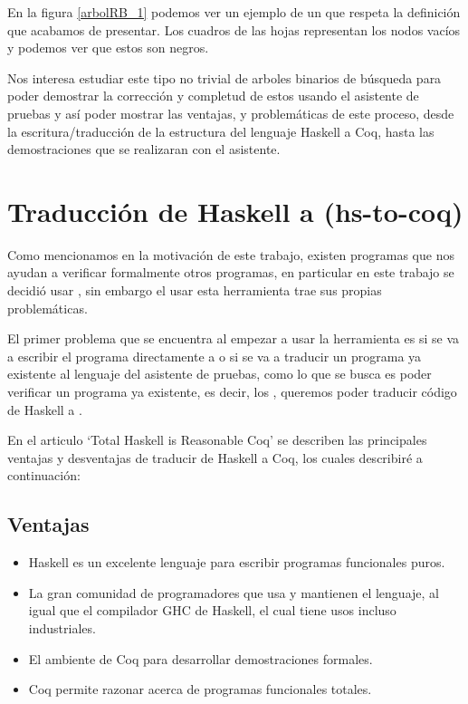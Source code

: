 En la figura \ref{arbolRB_1} podemos ver un ejemplo de un \arn que respeta la definici\'on que
acabamos de presentar. Los cuadros de las hojas representan los nodos vacíos y podemos ver que
estos son negros.

Nos interesa estudiar este tipo no trivial de arboles binarios de búsqueda para poder demostrar la
correcci\'on y completud de estos usando el asistente de pruebas {\coq} y así poder mostrar las
ventajas, y problemáticas de este proceso, desde la escritura/traducción de la estructura del
lenguaje Haskell a Coq, hasta las demostraciones que se realizaran con el asistente.

\section{Traducción de Haskell a {\coq} (hs-to-coq)}
Como mencionamos en la motivación de este trabajo, existen programas que nos ayudan a verificar
formalmente otros programas, en particular en este trabajo se decidió usar {\coq}, sin embargo el
usar esta herramienta trae sus propias problemáticas.

El primer problema que se encuentra al empezar a usar la herramienta es si se va a escribir el
programa directamente a {\coq} o si se va a traducir un programa ya existente al lenguaje del
asistente de pruebas, como lo que se busca es poder verificar un programa ya existente, es decir,
los {\arns}, queremos poder traducir código de Haskell a {\coq}.

En el articulo `Total Haskell is Reasonable Coq' \cite{thrc} se describen las principales ventajas
y desventajas de traducir de Haskell a Coq, los cuales describiré a continuaci\'on:

\subsection{Ventajas}
\begin{itemize}
    \item Haskell es un excelente lenguaje para escribir programas funcionales puros.
    \item La gran comunidad de programadores que usa y mantienen el lenguaje, al igual que el
    compilador GHC de Haskell, el cual tiene usos incluso industriales.
    \item El ambiente de Coq para desarrollar demostraciones formales.
    \item Coq permite razonar acerca de programas funcionales totales.
\end{itemize}

